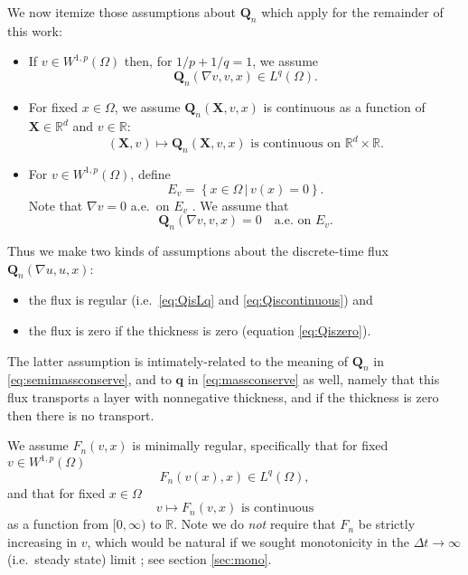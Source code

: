 \documentclass[final,leqno,onefignum,onetabnum]{siamltex1213bueler}
\newcommand\bq{\mathbf{q}}
\newcommand\bQ{\mathbf{Q}}
\newcommand\bX{\mathbf{X}}
\renewcommand{\grad}{\nabla}
\newcommand\RR{\mathbb{R}}
\begin{document}
We now itemize those assumptions about $\bQ_n$ which apply for the remainder of this work:
\begin{itemize}
\item If $v \in W^{1,p}(\Omega)$ then, for $1/p + 1/q = 1$, we assume
\begin{equation}
\bQ_n(\grad v,v,x) \in L^q(\Omega). \label{eq:QisLq}
\end{equation}
\item For fixed $x\in \Omega$, we assume $\bQ_n(\bX,v,x)$ is continuous as a function of $\bX\in\RR^d$ and $v\in\RR$:
\begin{equation}
(\bX,v) \mapsto \bQ_n(\bX,v,x) \text{ is continuous on } \RR^d \times \RR.  \label{eq:Qiscontinuous}
\end{equation}
\item For $v \in W^{1,p}(\Omega)$, define
    $$E_v = \left\{x\in\Omega \,\big|\, v(x) = 0\right\}.$$
Note that $\grad v = 0$ a.e.~on $E_v$ \cite[lemma A.4 of chapter II]{KinderlehrerStampacchia}.  We assume that
\begin{equation}
\bQ_n(\grad v,v,x)=0 \quad \text{a.e.~on } E_v. \label{eq:Qiszero}
\end{equation}
\end{itemize}

Thus we make two kinds of assumptions about the discrete-time flux $\bQ_n(\grad u,u,x)$: \begin{itemize}
\item the flux is regular (i.e.~\eqref{eq:QisLq} and \eqref{eq:Qiscontinuous}) and
\item the flux is zero if the thickness is zero (equation \eqref{eq:Qiszero}).
\end{itemize}
The latter assumption is intimately-related to the meaning of $\bQ_n$ in \eqref{eq:semimassconserve}, and to $\bq$ in \eqref{eq:massconserve} as well, namely that this flux transports a layer with nonnegative thickness, and if the thickness is zero then there is no transport.

We assume $F_n(v,x)$ is minimally regular, specifically that for fixed $v\in W^{1,p}(\Omega)$
\begin{equation}
F_n(v(x),x) \in L^q(\Omega),  \label{eq:FisLq}
\end{equation}
and that for fixed $x\in\Omega$
\begin{equation}
v \mapsto F_n(v,x) \text{ is continuous}  \label{eq:Fiscontinuous}
\end{equation}
as a function from $[0,\infty)$ to $\RR$.  Note we do \emph{not} require that $F_n$ be strictly increasing in $v$, which would be natural if we sought monotonicity in the $\Delta t \to \infty$ (i.e.~steady state) limit \cite{JouvetBueler2012}; see section \ref{sec:mono}.
\end{document}
